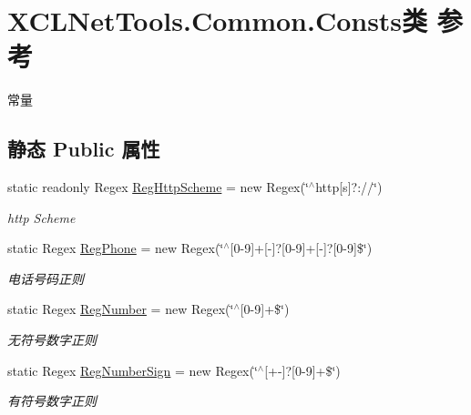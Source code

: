 \hypertarget{class_x_c_l_net_tools_1_1_common_1_1_consts}{\section{X\-C\-L\-Net\-Tools.\-Common.\-Consts类 参考}
\label{class_x_c_l_net_tools_1_1_common_1_1_consts}
}


常量  


\subsection*{静态 Public 属性}
\begin{DoxyCompactItemize}
\item 
static readonly Regex \hyperlink{class_x_c_l_net_tools_1_1_common_1_1_consts_a86f2f516b20b37531db1c7bffea20087}{Reg\-Http\-Scheme} = new Regex(\char`\"{}$^\wedge$http\mbox{[}s\mbox{]}?\-://\char`\"{})
\begin{DoxyCompactList}\small\item\em http Scheme \end{DoxyCompactList}\item 
static Regex \hyperlink{class_x_c_l_net_tools_1_1_common_1_1_consts_a88185aad823255cb7bf15a88d8ef55de}{Reg\-Phone} = new Regex(\char`\"{}$^\wedge$\mbox{[}0-\/9\mbox{]}+\mbox{[}-\/\mbox{]}?\mbox{[}0-\/9\mbox{]}+\mbox{[}-\/\mbox{]}?\mbox{[}0-\/9\mbox{]}\$\char`\"{})
\begin{DoxyCompactList}\small\item\em 电话号码正则 \end{DoxyCompactList}\item 
static Regex \hyperlink{class_x_c_l_net_tools_1_1_common_1_1_consts_a77b7430f7b6be306f3168d8f954803ec}{Reg\-Number} = new Regex(\char`\"{}$^\wedge$\mbox{[}0-\/9\mbox{]}+\$\char`\"{})
\begin{DoxyCompactList}\small\item\em 无符号数字正则 \end{DoxyCompactList}\item 
static Regex \hyperlink{class_x_c_l_net_tools_1_1_common_1_1_consts_aaa6eaa871d664473d2e6d189c825f177}{Reg\-Number\-Sign} = new Regex(\char`\"{}$^\wedge$\mbox{[}+-\/\mbox{]}?\mbox{[}0-\/9\mbox{]}+\$\char`\"{})
\begin{DoxyCompactList}\small\item\em 有符号数字正则 \end{DoxyCompactList}\item 

\end{DoxyCompactItemize}
